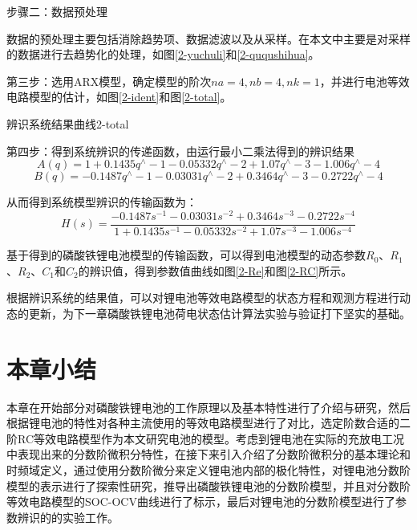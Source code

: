 步骤二：数据预处理

数据的预处理主要包括消除趋势项、数据滤波以及从采样。在本文中主要是对采样的数据进行去趋势化的处理，如图\ref{2-yuchuli}和\ref{2-ququshihua}。

第三步：选用ARX模型，确定模型的阶次$na=4,nb=4,nk=1$，并进行电池等效电路模型的估计，如图\ref{2-ident}和图\ref{2-total}。

\begin{pics}[htbp]{辨识系统结果曲线}{2-total}
\end{pics}



第四步：得到系统辨识的传递函数，由运行最小二乘法得到的辨识结果
\begin{equation}
A\left( q \right)=1+0.1435{{q}^{\wedge }}-1-0.05332{{q}^{\wedge }}-2+1.07{{q}^{\wedge }}-3-1.006{{q}^{\wedge }}-4
\end{equation}
\begin{equation}
B\left( q \right)=-0.1487{{q}^{\wedge }}-1-0.03031{{q}^{\wedge }}-2+0.3464{{q}^{\wedge }}-3-0.2722{{q}^{\wedge }}-4
\end{equation}

从而得到系统模型辨识的传输函数为：
\begin{equation}
H\left( s \right)=\frac{-0.1487{{s}^{-1}}-0.03031{{s}^{-2}}+0.3464{{s}^{-3}}-0.2722{{s}^{-4}}}{1+0.1435{{s}^{-1}}-0.05332{{s}^{-2}}+1.07{{s}^{-3}}-1.006{{s}^{-4}}}
\end{equation}	
	  
	基于得到的磷酸铁锂电池模型的传输函数，可以得到电池模型的动态参数${{R}_{0}}$、${{R}_{1}}$、${{R}_{2}}$、${{C}_{1}}$和${{C}_{2}}$的辨识值，得到参数值曲线如图\ref{2-Re}和图\ref{2-RC}所示。

根据辨识系统的结果值，可以对锂电池等效电路模型的状态方程和观测方程进行动态的更新，为下一章磷酸铁锂电池荷电状态估计算法实验与验证打下坚实的基础。
\FloatBarrier
\section{本章小结}
本章在开始部分对磷酸铁锂电池的工作原理以及基本特性进行了介绍与研究，然后根据锂电池的特性对各种主流使用的等效电路模型进行了对比，选定阶数合适的二阶RC等效电路模型作为本文研究电池的模型。考虑到锂电池在实际的充放电工况中表现出来的分数阶微积分特性，在接下来引入介绍了分数阶微积分的基本理论和时频域定义，通过使用分数阶微分来定义锂电池内部的极化特性，对锂电池分数阶模型的表示进行了探索性研究，推导出磷酸铁锂电池的分数阶模型，并且对分数阶等效电路模型的SOC-OCV曲线进行了标示，最后对锂电池的分数阶模型进行了参数辨识的的实验工作。

